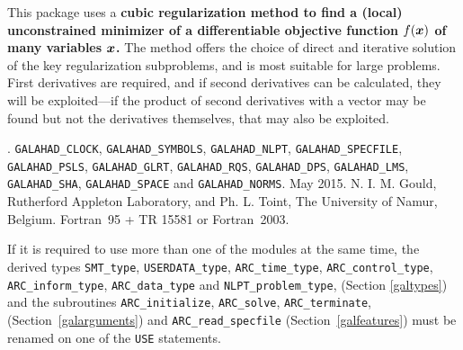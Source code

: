 \documentclass{galahad}
\newcommand{\packagename}{ARC}
\newcommand{\fullpackagename}{\libraryname\_\packagename}
\begin{document}
\galheader


\galsummary
This package uses a {\bf cubic regularization method to find a (local)
unconstrained minimizer of a differentiable objective function $f({\bm{x}})$
of many variables ${\bm{x}}$.} The method offers the choice of direct
and iterative solution of the key regularization subproblems, and
is most suitable for large problems. First derivatives are required,
and if second derivatives can be calculated, they will be exploited---if
the product of second derivatives with a vector may be found but
not the derivatives themselves, that may also be exploited.


\galattributes
\galversions{\tt  \fullpackagename\_single, \fullpackagename\_double}.
\galuses
{\tt GALAHAD\_CLOCK},
{\tt GALAHAD\_SY\-M\-BOLS},
{\tt GALAHAD\_NLPT},
{\tt GALAHAD\_SPECFILE},
{\tt GALAHAD\_PSLS},
{\tt GALAHAD\_GLRT},
{\tt GALAHAD\_RQS},
{\tt GALAHAD\_DPS},
{\tt GALAHAD\_LMS},
{\tt GALAHAD\_SHA},
{\tt GALAHAD\_SPACE} and
{\tt GALAHAD\_NORMS}.
\galdate May 2015.
\galorigin N. I. M. Gould, Rutherford Appleton Laboratory,
and Ph. L. Toint, The University of Namur, Belgium.
\gallanguage Fortran~95 + TR 15581 or Fortran~2003.


\galhowto




\noindent
If it is required to use more than one of the modules at the same time, 
the derived types
{\tt SMT\_type},
{\tt USERDATA\_type},
{\tt \packagename\_time\_\-type},
{\tt \packagename\_control\_type},
{\tt \packagename\_inform\_type},
{\tt \packagename\_data\_type}
and
{\tt NLPT\_problem\_type},
(Section \ref{galtypes})
and the subroutines
{\tt \packagename\_initialize},
{\tt \packagename\_\-solve},
{\tt \packagename\_terminate},
(Section~\ref{galarguments})
and
{\tt \packagename\_read\_specfile}
(Section~\ref{galfeatures})
must be renamed on one of the {\tt USE} statements.

\end{document}
